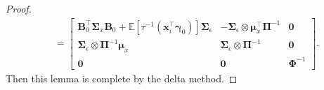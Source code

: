 \documentclass[12pt, A4]{article}
\newcommand{\ObsCov}{\textbf{x}_i}
\newcommand{\LogCoe}{\boldsymbol{\gamma}}
\newcommand{\IdenMat}{\textbf{I}}
\begin{document}
\begin{proof}
\begin{align*}
                &=  \begin{bmatrix}
                        \textbf{B}^{\top}_0 \boldsymbol{\Sigma}_{x} \textbf{B}_0 + \mathbb{E} [\tau^{-1}(\ObsCov^{\top}\LogCoe_0)] \boldsymbol{\Sigma}_{\epsilon} &  -\boldsymbol{\Sigma}_{\epsilon} \otimes \boldsymbol{\mu}_x^{\top} \boldsymbol{\Pi}^{-1}  & \textbf{0} \\ 
                        \boldsymbol{\Sigma}_{\epsilon} \otimes \boldsymbol{\Pi}^{-1}\boldsymbol{\mu}_x & \boldsymbol{\Sigma}_{\epsilon} \otimes \boldsymbol{\Pi}^{-1} & \textbf{0} \\ 
                        \textbf{0} & \textbf{0} & \boldsymbol{\Phi}^{-1} 
                    \end{bmatrix}.
            \end{align*}
        Then this lemma is complete by the delta method.
    \end{proof}
\end{document}
